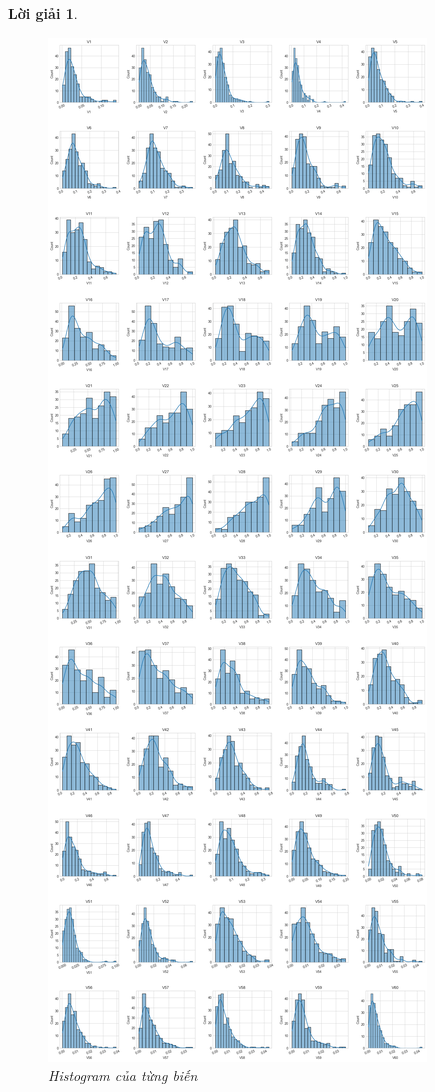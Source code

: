 \documentclass[14pt, a4paper]{article}
\theoremstyle{sltheorem}
\theoremstyle{soltheorem}
\newtheorem*{loigiai}{Lời giải}
\begin{document}
\begin{loigiai}
    \begin{figure}[h!]
        \centering
        \includegraphics[scale=0.2]{histogram.png}
        \caption{Histogram của từng biến}
        \label{fig:histogram}
    \end{figure}


\end{loigiai}
\end{document}
